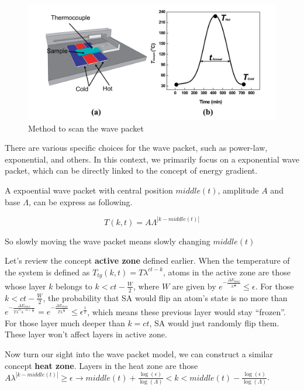 \documentclass[twocolumn,superscriptaddress,english,showpacs,longbibliography]{revtex4-2}
\begin{document}
\begin{figure}[h]
\centering
\includegraphics[width=\columnwidth]{../notes/images/zhang2014.png}
\caption{Method to scan the wave packet}
\end{figure}

There are various specific choices for the wave packet, such as
power-law, exponential, and others. In this context, we primarily focus
on a exponential wave packet, which can be directly linked to the
concept of energy gradient.

A expoential wave packet with central position $middle(t)$, amplitude
$A$ and base $\Lambda$, can be express as following.

\[
T(k,t) = A\Lambda^{|k-middle(t)|}
\]

So slowly moving the wave packet means slowly changing $middle(t)$

Let's review the concept \textbf{active zone} defined earlier. When the
temperature of the system is defined as
$T_{tg}(k, t) = T\lambda^{ct-k}$, atoms in the active zone are those
whose layer $k$ belongs to $k<ct - \frac{W}{2}$, where $W$ are
given by
$e^{-\frac{\Delta E_{max}}{\lambda^{\frac{W}{2}}}}\leq \epsilon$. For
those $k<ct - \frac{W}{2}$, the probability that SA would flip an
atom's state is no more than
$e^{-\frac{\Delta E_{max}}{T\lambda^{ct}\lambda^{-ct + \frac{W}{2}}}}=e^{-\frac{\Delta E_{max}}{T\lambda^{\frac{W}{2}}}}\leq \epsilon^{\frac{1}{T}}$,
which means these previous layer would stay ``frozen''. For those layer
much deeper than $k = ct$, SA would just randomly flip them. These
layer won't affect layers in active zone.

Now turn our sight into the wave packet model, we can construct a
similar concept \textbf{heat zone}. Layers in the heat zone are those
$A\lambda^{|k-middle(t)|}\ge \epsilon\rightarrow middle(t) + \frac{\log(\epsilon)}{\log(\Lambda)}< k < middle(t) - \frac{\log(\epsilon)}{\log(\Lambda)}$.
\end{document}

